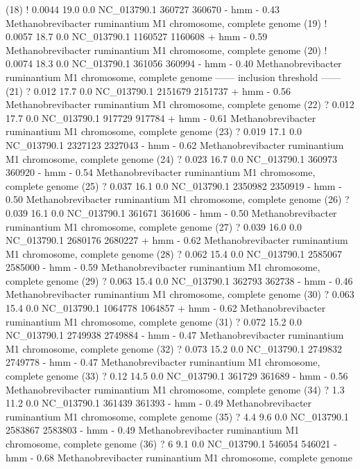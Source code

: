 \begin{sreoutput}
 (18) !    0.0044   19.0   0.0  NC_013790.1  360727  360670 - hmm     - 0.43  Methanobrevibacter ruminantium M1 chromosome, complete genome
 (19) !    0.0057   18.7   0.0  NC_013790.1 1160527 1160608 + hmm     - 0.59  Methanobrevibacter ruminantium M1 chromosome, complete genome
 (20) !    0.0074   18.3   0.0  NC_013790.1  361056  360994 - hmm     - 0.40  Methanobrevibacter ruminantium M1 chromosome, complete genome
 ------ inclusion threshold ------
 (21) ?     0.012   17.7   0.0  NC_013790.1 2151679 2151737 + hmm     - 0.56  Methanobrevibacter ruminantium M1 chromosome, complete genome
 (22) ?     0.012   17.7   0.0  NC_013790.1  917729  917784 + hmm     - 0.61  Methanobrevibacter ruminantium M1 chromosome, complete genome
 (23) ?     0.019   17.1   0.0  NC_013790.1 2327123 2327043 - hmm     - 0.62  Methanobrevibacter ruminantium M1 chromosome, complete genome
 (24) ?     0.023   16.7   0.0  NC_013790.1  360973  360920 - hmm     - 0.54  Methanobrevibacter ruminantium M1 chromosome, complete genome
 (25) ?     0.037   16.1   0.0  NC_013790.1 2350982 2350919 - hmm     - 0.50  Methanobrevibacter ruminantium M1 chromosome, complete genome
 (26) ?     0.039   16.1   0.0  NC_013790.1  361671  361606 - hmm     - 0.50  Methanobrevibacter ruminantium M1 chromosome, complete genome
 (27) ?     0.039   16.0   0.0  NC_013790.1 2680176 2680227 + hmm     - 0.62  Methanobrevibacter ruminantium M1 chromosome, complete genome
 (28) ?     0.062   15.4   0.0  NC_013790.1 2585067 2585000 - hmm     - 0.59  Methanobrevibacter ruminantium M1 chromosome, complete genome
 (29) ?     0.063   15.4   0.0  NC_013790.1  362793  362738 - hmm     - 0.46  Methanobrevibacter ruminantium M1 chromosome, complete genome
 (30) ?     0.063   15.4   0.0  NC_013790.1 1064778 1064857 + hmm     - 0.62  Methanobrevibacter ruminantium M1 chromosome, complete genome
 (31) ?     0.072   15.2   0.0  NC_013790.1 2749938 2749884 - hmm     - 0.47  Methanobrevibacter ruminantium M1 chromosome, complete genome
 (32) ?     0.073   15.2   0.0  NC_013790.1 2749832 2749778 - hmm     - 0.47  Methanobrevibacter ruminantium M1 chromosome, complete genome
 (33) ?      0.12   14.5   0.0  NC_013790.1  361729  361689 - hmm     - 0.56  Methanobrevibacter ruminantium M1 chromosome, complete genome
 (34) ?       1.3   11.2   0.0  NC_013790.1  361439  361393 - hmm     - 0.49  Methanobrevibacter ruminantium M1 chromosome, complete genome
 (35) ?       4.4    9.6   0.0  NC_013790.1 2583867 2583803 - hmm     - 0.49  Methanobrevibacter ruminantium M1 chromosome, complete genome
 (36) ?         6    9.1   0.0  NC_013790.1  546054  546021 - hmm     - 0.68  Methanobrevibacter ruminantium M1 chromosome, complete genome
\end{sreoutput}

